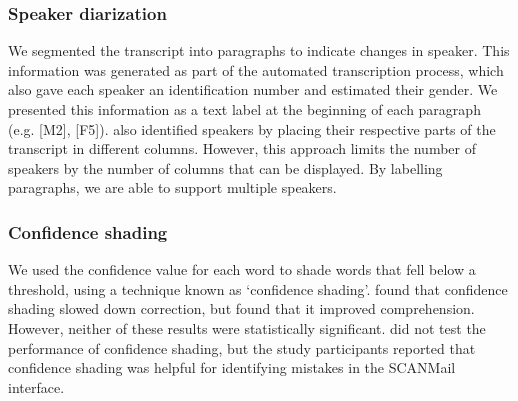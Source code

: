 \subsubsection{Speaker diarization}
We segmented the transcript into paragraphs to indicate changes in speaker. This information was generated as part of
the automated transcription process, which also gave each speaker an identification number and estimated their gender.
We presented this information as a text label at the beginning of each paragraph (e.g. [M2], [F5]).  \citet{Rubin2013}
also identified speakers by placing their respective parts of the transcript in different columns.  However, this
approach limits the number of speakers by the number of columns that can be displayed. By labelling paragraphs, we are
able to support multiple speakers.

\subsubsection{Confidence shading}
We used the confidence value for each word to shade words that fell below a threshold, using a technique known as
`confidence shading'. \citet{Suhm2001} found that confidence shading slowed down correction, but \citet{Vemuri2004}
found that it improved comprehension. However, neither of these results were statistically significant.
\citet{Burke2006} did not test the performance of confidence shading, but the study participants reported that
confidence shading was helpful for identifying mistakes in the SCANMail interface.



